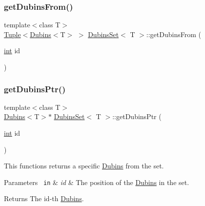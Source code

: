 \mbox{\label{class_dubins_set_a03b0025e832aa83736f64d8800ba2778}} 
\subsubsection{\texorpdfstring{getDubinsFrom()}{getDubinsFrom()}}
{\footnotesize\ttfamily template$<$class T$>$ \\
\mbox{\hyperlink{class_tuple}{Tuple}}$<$\mbox{\hyperlink{class_dubins}{Dubins}}$<$T$>$ $>$ \mbox{\hyperlink{class_dubins_set}{Dubins\+Set}}$<$ T $>$\+::get\+Dubins\+From (\begin{DoxyParamCaption}\item[{\mbox{\hyperlink{draw_8hh_aa620a13339ac3a1177c86edc549fda9b}{int}}}]{id }\end{DoxyParamCaption})\hspace{0.3cm}{\ttfamily [inline]}}

\mbox{\label{class_dubins_set_a18797b4a054cd1be2680a26603d2af9a}} 
\subsubsection{\texorpdfstring{getDubinsPtr()}{getDubinsPtr()}}
{\footnotesize\ttfamily template$<$class T$>$ \\
\mbox{\hyperlink{class_dubins}{Dubins}}$<$T$>$$\ast$ \mbox{\hyperlink{class_dubins_set}{Dubins\+Set}}$<$ T $>$\+::get\+Dubins\+Ptr (\begin{DoxyParamCaption}\item[{\mbox{\hyperlink{draw_8hh_aa620a13339ac3a1177c86edc549fda9b}{int}}}]{id }\end{DoxyParamCaption})\hspace{0.3cm}{\ttfamily [inline]}}

This functions returns a specific {\ttfamily \mbox{\hyperlink{class_dubins}{Dubins}}} from the set. 
\begin{DoxyParams}[1]{Parameters}
\mbox{\texttt{ in}}  & {\em id} & The position of the {\ttfamily \mbox{\hyperlink{class_dubins}{Dubins}}} in the set. \\
\hline
\end{DoxyParams}
\begin{DoxyReturn}{Returns}
The id-\/th {\ttfamily \mbox{\hyperlink{class_dubins}{Dubins}}}. 
\end{DoxyReturn}
\mbox{\label{class_dubins_set_a3dfb9cf9fc781deaa1f9d2e7201b81e7}} 
